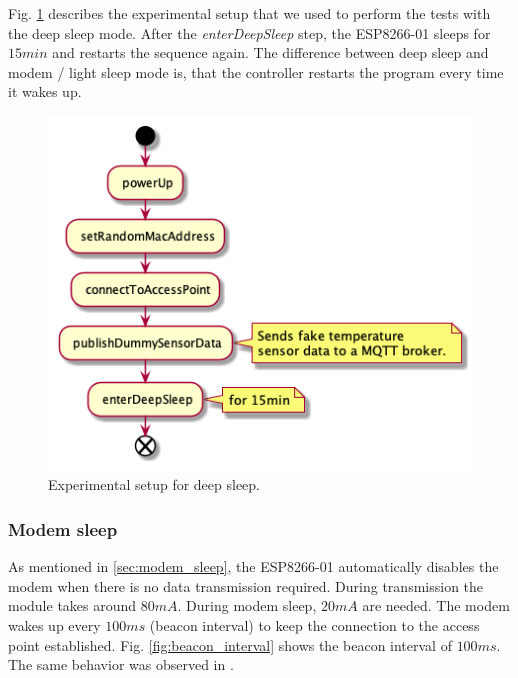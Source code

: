 Fig. \ref{fig:experiment_deep_sleep} describes the experimental setup that we used to perform the tests with the deep sleep mode.
After the \textit{enterDeepSleep} step, the ESP8266-01 sleeps for $15min$ and restarts the sequence again.
The difference between deep sleep and modem / light sleep mode is, that the controller restarts the program every time it wakes up.\\
\begin{figure}[H]
    \centering
    \includegraphics[width = 0.7 \linewidth]{fig/sequence_deep_sleep.png}
    \caption{Experimental setup for deep sleep.}
    \label{fig:experiment_deep_sleep}
\end{figure}

\subsubsection{Modem sleep}
As mentioned in \ref{sec:modem_sleep}, the ESP8266-01 automatically disables the modem when there is no data transmission required.
During transmission the module takes around $80mA$. During modem sleep, $20mA$ are needed.
The modem wakes up every $100ms$ (beacon interval) to keep the connection to the access point established.
Fig. \ref{fig:beacon_interval} shows the beacon interval of $100ms$. 
The same behavior was observed in \cite{montori_is_2017}.

